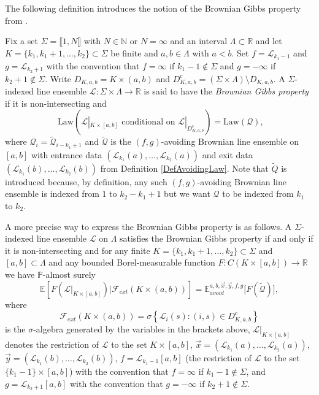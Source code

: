 The following definition introduces the notion of the Brownian Gibbs property from \cite{CorHamA}.
\begin{definition}\label{DefBGP}
Fix a set $\Sigma = \llbracket 1, N \rrbracket$ with $N \in \mathbb{N}$ or $N = \infty$ and an interval $\Lambda \subset \mathbb{R}$ and let $K = \{k_1, k_1 + 1, \dots, k_2 \} \subset \Sigma$ be finite and $a,b \in \Lambda$ with $a < b$. Set $f = \mathcal{L}_{k_1 - 1}$ and $g = \mathcal{L}_{k_2 + 1}$ with the convention that $f = \infty$ if $k_1 - 1 \not \in \Sigma$ and $g = -\infty$ if $k_2 +1 \not \in \Sigma$. Write $D_{K,a,b} = K \times (a,b)$ and $D_{K,a,b}^c = (\Sigma \times \Lambda) \setminus D_{K,a,b}$. A $\Sigma$-indexed line ensemble $\mathcal{L} : \Sigma \times \Lambda \rightarrow \mathbb{R}$ is said to have the {\em Brownian Gibbs property} if it is non-intersecting and 
$$\mbox{ Law}\left( \mathcal{L}|_{K \times [a,b]} \mbox{ conditional on } \mathcal{L}|_{D^c_{K,a,b}} \right)= \mbox{Law} \left( \mathcal{Q} \right),$$
where $\mathcal{Q}_i = \tilde{\mathcal{Q}}_{i - k_1 + 1}$ and $\tilde{\mathcal{Q}}$ is the $(f,g)$-avoiding Brownian line ensemble on $[a,b]$ with entrance data $(\mathcal{L}_{k_1}(a), \dots, \mathcal{L}_{k_2}(a))$ and exit data $(\mathcal{L}_{k_1}(b), \dots, \mathcal{L}_{k_2}(b))$ from Definition \ref{DefAvoidingLaw}. Note that $\tilde{Q}$ is introduced because, by definition, any such $(f,g)$-avoiding Brownian line ensemble is indexed from $1$ to $k_2 - k_1 + 1$ but we want $\mathcal{Q}$ to be indexed from $k_1$ to $k_2$.

A more precise way to express the Brownian Gibbs property is as follows. A $\Sigma$-indexed line ensemble $\mathcal{L}$ on $\Lambda$ satisfies the Brownian Gibbs property if and only if it is non-intersecting and for any finite $K = \{k_1, k_1 + 1, \dots, k_2 \} \subset \Sigma$ and $[a,b] \subset \Lambda$ and any bounded Borel-measurable function $F: C(K \times [a,b]) \rightarrow \mathbb{R}$ we have $\mathbb{P}$-almost surely
\begin{equation}\label{BGPTower}
\mathbb{E} \left[ F\left(\mathcal{L}|_{K \times [a,b]} \right)  {\big \vert} \mathcal{F}_{ext} (K \times (a,b))  \right] =\mathbb{E}_{avoid}^{a,b, \vec{x}, \vec{y}, f, g} \bigl[ F(\tilde{\mathcal{Q}}) \bigr],
\end{equation}
where
$$\mathcal{F}_{ext} (K \times (a,b)) = \sigma \left \{ \mathcal{L}_i(s): (i,s) \in D_{K,a,b}^c \right\}$$
is the $\sigma$-algebra generated by the variables in the brackets above, $ \mathcal{L}|_{K \times [a,b]}$ denotes the restriction of $\mathcal{L}$ to the set $K \times [a,b]$, $\vec{x} = (\mathcal{L}_{k_1}(a), \dots, \mathcal{L}_{k_2}(a))$, $\vec{y} = (\mathcal{L}_{k_1}(b), \dots, \mathcal{L}_{k_2}(b))$, $f = \mathcal{L}_{k_1 - 1}[a,b]$ (the restriction of $\mathcal{L}$ to the set $\{k_1 - 1 \} \times [a,b]$) with the convention that $f = \infty$ if $k_1 - 1 \not \in \Sigma$, and $g = \mathcal{L}_{k_2 +1}[a,b]$ with the convention that $g =-\infty$ if $k_2 +1 \not \in \Sigma$. 
\end{definition}

